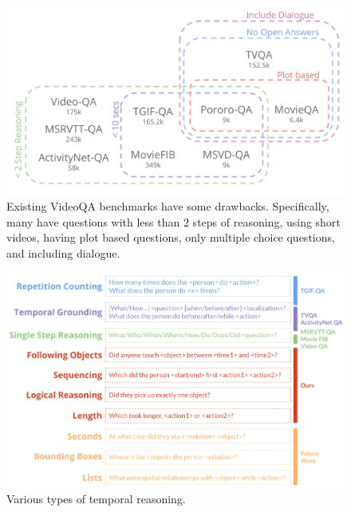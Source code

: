 \documentclass[10pt,twocolumn,letterpaper]{article}
\begin{document}
\begin{figure}[t]
\begin{center}
\includegraphics[width=0.8\linewidth]{Figures/figure_videoQA.png}
\end{center}
   \caption{Existing VideoQA benchmarks have some drawbacks. Specifically, many have questions with less than 2 steps of reasoning, using short videos, having plot based questions, only multiple choice questions, and including dialogue.}
\label{existing_benchmarks}
\end{figure}


\begin{figure}[t]
\begin{center}
\includegraphics[width=0.8\linewidth]{Figures/figure_temporalTypes.png}
\end{center}
   \caption{Various types of temporal reasoning.}
\label{temporal_types}
\end{figure}
\end{document}
